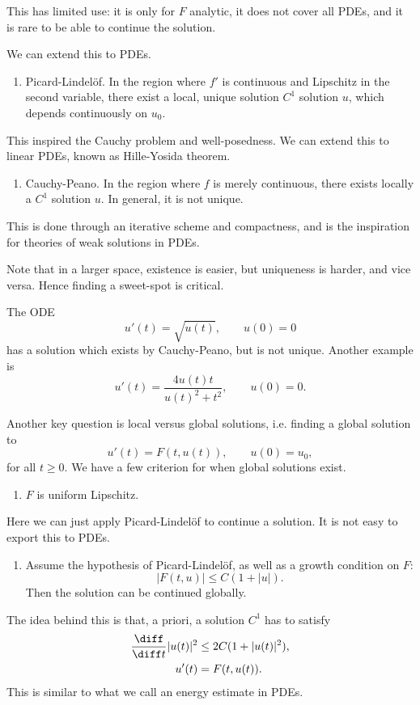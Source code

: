 \documentclass[12pt]{article}
\begin{document}
This has limited use: it is only for $F$ analytic, it does not cover all PDEs, and it is rare to be able to continue the solution.

We can extend this to PDEs.

\begin{enumerate}[resume*]
	\item Picard-Lindel\"of. In the region where $f'$ is continuous and Lipschitz in the second variable, there exist a local, unique solution $C^1$ solution $u$, which depends continuously on $u_0$.
\end{enumerate}

This inspired the Cauchy problem and well-posedness. We can extend this to linear PDEs, known as Hille-Yosida theorem.

\begin{enumerate}[resume*]
	\item Cauchy-Peano. In the region where $f$ is merely continuous, there exists locally a $C^1$ solution $u$. In general, it is not unique.
\end{enumerate}

This is done through an iterative scheme and compactness, and is the inspiration for theories of weak solutions in PDEs.

Note that in a larger space, existence is easier, but uniqueness is harder, and vice versa. Hence finding a sweet-spot is critical.

\begin{exbox}
	The ODE
	\[
		u'(t) = \sqrt{u(t)}, \qquad u(0) = 0
	\]
	has a solution which exists by Cauchy-Peano, but is not unique. Another example is
	\[
	u'(t) = \frac{4u(t)t}{u(t)^2 + t^2}, \qquad u(0) = 0.
	\]
\end{exbox}

Another key question is local versus global solutions, i.e. finding a global solution to
\[
u'(t) = F(t, u(t)), \qquad u(0) = u_0,
\]
for all $t \geq 0$. We have a few criterion for when global solutions exist.
\begin{enumerate}[label = Criterion \arabic*.]
	\item $F$ is uniform Lipschitz.
\end{enumerate}
Here we can just apply Picard-Lindel\"of to continue a solution. It is not easy to export this to PDEs.

\begin{enumerate}[resume*]
	\item Assume the hypothesis of Picard-Lindel\"of, as well as a growth condition on $F$:
		\[
		|F(t, u)| \leq C(1 + |u|).
		\]
		Then the solution can be continued globally.
\end{enumerate}
The idea behind this is that, a priori, a solution $C^1$ has to satisfy
\begin{align*}
	\frac{\diff}{\diff t} |u(t)|^2 &\leq 2 C (1 + |u(t)|^2), \\
	u'(t) &= F(t, u(t)).
\end{align*}
This is similar to what we call an energy estimate in PDEs.
\end{document}
